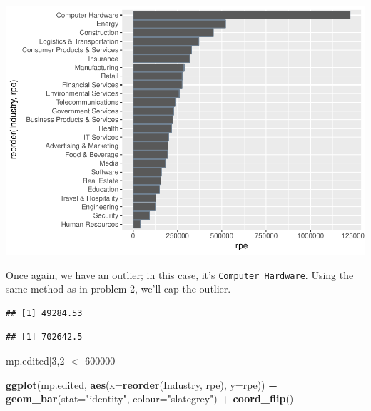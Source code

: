\documentclass[]{article}
\newenvironment{Shaded}{\begin{snugshade}}{\end{snugshade}}
\newcommand{\KeywordTok}[1]{\textcolor[rgb]{0.13,0.29,0.53}{\textbf{#1}}}
\newcommand{\DataTypeTok}[1]{\textcolor[rgb]{0.13,0.29,0.53}{#1}}
\newcommand{\DecValTok}[1]{\textcolor[rgb]{0.00,0.00,0.81}{#1}}
\newcommand{\StringTok}[1]{\textcolor[rgb]{0.31,0.60,0.02}{#1}}
\newcommand{\OperatorTok}[1]{\textcolor[rgb]{0.81,0.36,0.00}{\textbf{#1}}}
\newcommand{\NormalTok}[1]{#1}
\begin{document}
\includegraphics{DATA_608_Project_1_files/figure-latex/unnamed-chunk-10-1.pdf}

Once again, we have an outlier; in this case, it's
\texttt{Computer\ Hardware}. Using the same method as in problem 2,
we'll cap the outlier.

\begin{Shaded}
\end{Shaded}

\begin{verbatim}
## [1] 49284.53
\end{verbatim}

\begin{Shaded}
\end{Shaded}

\begin{verbatim}
## [1] 702642.5
\end{verbatim}

\begin{Shaded}
\begin{Highlighting}[]
\NormalTok{mp.edited[}\DecValTok{3}\NormalTok{,}\DecValTok{2}\NormalTok{] <-}\StringTok{ }\DecValTok{600000}

\KeywordTok{ggplot}\NormalTok{(mp.edited, }\KeywordTok{aes}\NormalTok{(}\DataTypeTok{x=}\KeywordTok{reorder}\NormalTok{(Industry, rpe), }\DataTypeTok{y=}\NormalTok{rpe)) }\OperatorTok{+}
\StringTok{  }\KeywordTok{geom_bar}\NormalTok{(}\DataTypeTok{stat=}\StringTok{"identity"}\NormalTok{, }\DataTypeTok{colour=}\StringTok{"slategrey"}\NormalTok{) }\OperatorTok{+}
\StringTok{  }\KeywordTok{coord_flip}\NormalTok{()}
\end{Highlighting}
\end{Shaded}
\end{document}
